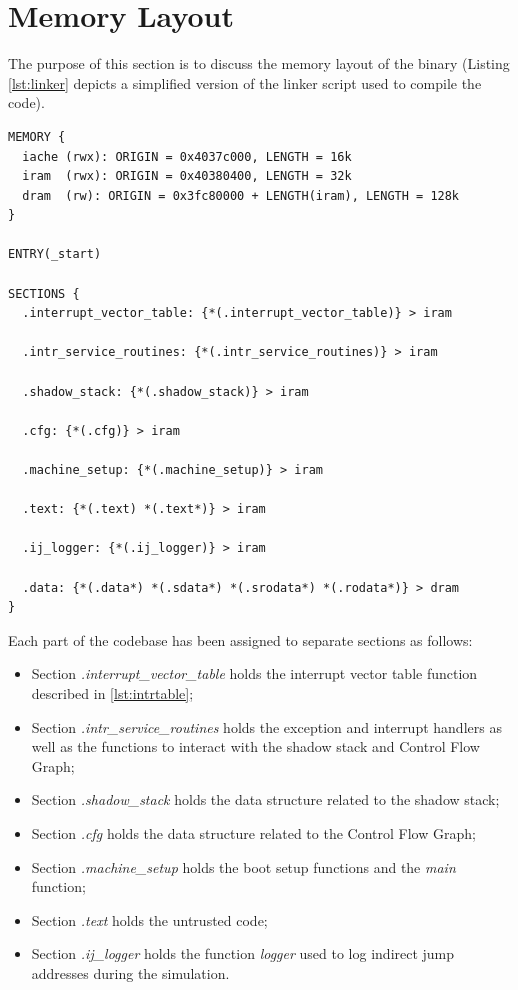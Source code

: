 \section{Memory Layout}
\label{sec:layout}

The purpose of this section is to discuss the memory layout of the binary (Listing
\ref{lst:linker} depicts a simplified version of the linker script used to
compile the code). \\
\begin{lstlisting}[style=CStyle, caption= Simplified linker script, label={lst:linker}]
MEMORY {
  iache (rwx): ORIGIN = 0x4037c000, LENGTH = 16k
  iram  (rwx): ORIGIN = 0x40380400, LENGTH = 32k
  dram  (rw): ORIGIN = 0x3fc80000 + LENGTH(iram), LENGTH = 128k
}

ENTRY(_start)

SECTIONS {
  .interrupt_vector_table: {*(.interrupt_vector_table)} > iram

  .intr_service_routines: {*(.intr_service_routines)} > iram

  .shadow_stack: {*(.shadow_stack)} > iram

  .cfg: {*(.cfg)} > iram

  .machine_setup: {*(.machine_setup)} > iram

  .text: {*(.text) *(.text*)} > iram

  .ij_logger: {*(.ij_logger)} > iram

  .data: {*(.data*) *(.sdata*) *(.srodata*) *(.rodata*)} > dram
}
\end{lstlisting}

Each part of the codebase has been assigned to separate sections as follows:
\begin{itemize}
  \item Section \textit{.interrupt\_vector\_table} holds the interrupt vector
    table function described in \ref{lst:intrtable};

  \item Section \textit{.intr\_service\_routines} holds the exception and
    interrupt handlers as well as the functions to interact with the shadow
    stack and Control Flow Graph;

  \item Section \textit{.shadow\_stack} holds the data structure related to the
    shadow stack;

  \item Section \textit{.cfg} holds the data structure related to the Control
    Flow Graph;

  \item Section \textit{.machine\_setup} holds the boot setup functions and the
    \textit{main} function;

  \item Section \textit{.text} holds the untrusted code;

  \item Section \textit{.ij\_logger} holds the function \textit{logger} used to log
    indirect jump addresses during the simulation.
\end{itemize}

